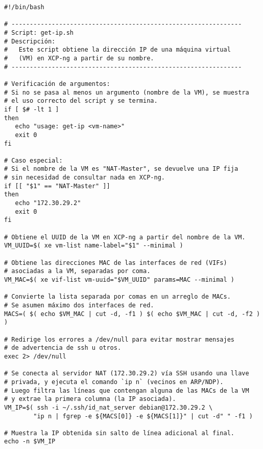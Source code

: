 \begin{verbatim}
#!/bin/bash

# ---------------------------------------------------------------
# Script: get-ip.sh
# Descripción:
#   Este script obtiene la dirección IP de una máquina virtual 
#   (VM) en XCP-ng a partir de su nombre.
# ---------------------------------------------------------------

# Verificación de argumentos:
# Si no se pasa al menos un argumento (nombre de la VM), se muestra 
# el uso correcto del script y se termina.
if [ $# -lt 1 ]
then
   echo "usage: get-ip <vm-name>"
   exit 0
fi

# Caso especial: 
# Si el nombre de la VM es "NAT-Master", se devuelve una IP fija 
# sin necesidad de consultar nada en XCP-ng.
if [[ "$1" == "NAT-Master" ]]
then
   echo "172.30.29.2"
   exit 0
fi

# Obtiene el UUID de la VM en XCP-ng a partir del nombre de la VM.
VM_UUID=$( xe vm-list name-label="$1" --minimal )

# Obtiene las direcciones MAC de las interfaces de red (VIFs) 
# asociadas a la VM, separadas por coma.
VM_MAC=$( xe vif-list vm-uuid="$VM_UUID" params=MAC --minimal )

# Convierte la lista separada por comas en un arreglo de MACs. 
# Se asumen máximo dos interfaces de red.
MACS=( $( echo $VM_MAC | cut -d, -f1 ) $( echo $VM_MAC | cut -d, -f2 ) )

# Redirige los errores a /dev/null para evitar mostrar mensajes 
# de advertencia de ssh u otros.
exec 2> /dev/null

# Se conecta al servidor NAT (172.30.29.2) vía SSH usando una llave 
# privada, y ejecuta el comando `ip n` (vecinos en ARP/NDP).
# Luego filtra las líneas que contengan alguna de las MACs de la VM 
# y extrae la primera columna (la IP asociada).
VM_IP=$( ssh -i ~/.ssh/id_nat_server debian@172.30.29.2 \
        "ip n | fgrep -e ${MACS[0]} -e ${MACS[1]}" | cut -d" " -f1 )

# Muestra la IP obtenida sin salto de línea adicional al final.
echo -n $VM_IP

\end{verbatim}